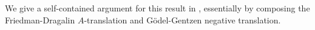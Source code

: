 \documentclass[10pt,a4paper]{amsart}
\theoremstyle{plain}
\theoremstyle{definition}
\newcommand{\oldtodo}[1]{\todo{#1}} %
\newcommand{\anupam}[1]{\todo[color=green]{A: #1}}
\renewcommand{\todo}[1]{}
\renewcommand{\anupam}[1]{}
\theoremstyle{plain}
\theoremstyle{definition} %
\newcommand{\closure}[1]{\langle #1 \rangle}
\newcommand{\nat}{\mathit{N}}
\newcommand{\N}{\nat} %
\newcommand{\muN}[1]{\mu #1 \subseteq \N}
\newcommand{\LJ}{\mathsf{LJ}}
\newcommand{\muLJ}{\mu\LJ}
\newcommand{\muLJneg}{\muLJ^-}
\newcommand{\Lang}{\mathcal L}
\newcommand{\lang}[1]{\Lang_{#1}}
\newcommand{\langmuarith}{\lang \mu}
\newcommand{\Pin}[2]{\Pi^{#1}_{#2}}
\newcommand{\PA}{\mathsf{PA}}
\newcommand{\HA}{\mathsf{HA}}
\newcommand{\muPA}{\mu\PA}
\newcommand{\muHA}{\mu\HA}
\newcommand{\SOPA}{\PA2}
\newcommand{\SOHA}{\HA2}
\begin{document}
We give a self-contained argument for this result in , essentially by composing the Friedman-Dragalin $A$-translation and G\"odel-Gentzen negative translation. 


\anupam{commented proof idea below}






\end{document}

